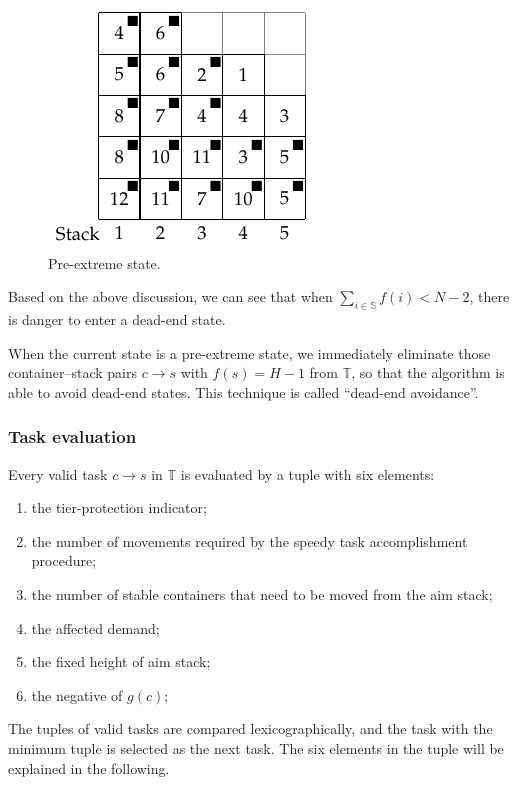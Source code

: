 \documentclass[review,3p,times,12pt,number]{elsarticle}\usepackage{amsmath}\usepackage{amssymb}
\begin{document}
\begin{figure}[htbp]
\centering
\includegraphics{figs/c.pdf}
\caption{Pre-extreme state.}
\label{fig:pre-extreme}
\end{figure}

Based on the above discussion, we can see that when $\sum_{i\in\mathbb{S}}f(i)<N-2$, there is danger to enter a dead-end state.

When the current state is a pre-extreme state, we immediately eliminate those container--stack pairs $c\rightarrow s$ with $f(s)=H-1$ from $\mathbb T$, so that the algorithm is able to avoid dead-end states. This technique is called ``dead-end avoidance''.

\subsubsection{Task evaluation}

Every valid task $c\rightarrow s$ in $\mathbb{T}$ is evaluated by a tuple with six elements:
\begin{enumerate}
\item the tier-protection indicator;
\item the number of movements required by the speedy task accomplishment procedure;
\item the number of stable containers that need to be moved from the aim stack;
\item the affected demand;
\item the fixed height of aim stack;
\item the negative of $g(c)$;
\end{enumerate}
The tuples of valid tasks are compared lexicographically, and the task with the minimum tuple is selected as the next task. The six elements in the tuple will be explained in the following.
\end{document}
